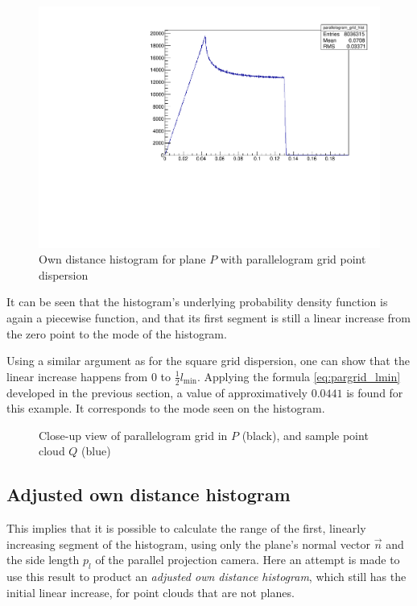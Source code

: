 \begin{figure}[H]
\centering
\includegraphics[width=.5\textwidth]{fig/parallelogram_grid.pdf}
\caption{Own distance histogram for plane $P$ with parallelogram grid point dispersion}
\label{fig:plane_par_cphist}
\end{figure}

It can be seen that the histogram's underlying probability density function is again a piecewise function, and that its first segment is still a linear increase from the zero point to the mode of the histogram.

Using a similar argument as for the square grid dispersion, one can show that the linear increase happens from $0$ to $\frac{1}{2} l_\text{min}$. Applying the formula \ref{eq:pargrid_lmin} developed in the previous section, a value of approximatively $0.0441$ is found for this example. It corresponds to the mode seen on the histogram.

\begin{figure}[p]
\centering
{
	\setlength{\fboxsep}{0pt}%
	\setlength{\fboxrule}{0.5pt}%
}
\caption{Close-up view of parallelogram grid in $P$ (black), and sample point cloud $Q$ (blue)}
\label{fig:par_grid}
\end{figure}



\subsection{Adjusted own distance histogram}
This implies that it is possible to calculate the range of the first, linearly increasing segment of the histogram, using only the plane's normal vector $\vec{n}$ and the side length $p_l$ of the parallel projection camera. Here an attempt is made to use this result to product an \emph{adjusted own distance histogram}, which still has the initial linear increase, for point clouds that are not planes.

